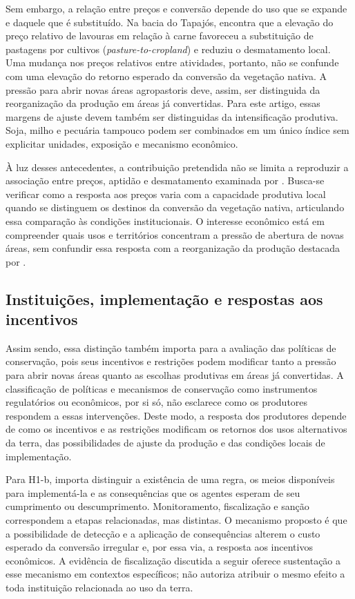 Sem embargo, a relação entre preços e conversão depende do uso que se expande e daquele que é substituído. Na bacia do Tapajós,  encontra que a elevação do preço relativo de lavouras em relação à carne favoreceu a substituição de pastagens por cultivos (\textit{pasture-to-cropland}) e reduziu o desmatamento local. Uma mudança nos preços relativos entre atividades, portanto, não se confunde com uma elevação do retorno esperado da conversão da vegetação nativa. A pressão para abrir novas áreas agropastoris deve, assim, ser distinguida da reorganização da produção em áreas já convertidas. Para este artigo, essas margens de ajuste devem também ser distinguidas da intensificação produtiva. Soja, milho e pecuária tampouco podem ser combinados em um único índice sem explicitar unidades, exposição e mecanismo econômico.

À luz desses antecedentes, a contribuição pretendida não se limita a reproduzir a associação entre preços, aptidão e desmatamento examinada por . Busca-se verificar como a resposta aos preços varia com a capacidade produtiva local quando se distinguem os destinos da conversão da vegetação nativa, articulando essa comparação às condições institucionais. O interesse econômico está em compreender quais usos e territórios concentram a pressão de abertura de novas áreas, sem confundir essa resposta com a reorganização da produção destacada por .

\subsection{Instituições, implementação e respostas aos incentivos}

Assim sendo, essa distinção também importa para a avaliação das políticas de conservação, pois seus incentivos e restrições podem modificar tanto a pressão para abrir novas áreas quanto as escolhas produtivas em áreas já convertidas. A classificação de políticas e mecanismos de conservação como instrumentos regulatórios ou econômicos, por si só, não esclarece como os produtores respondem a essas intervenções. Deste modo, a resposta dos produtores depende de como os incentivos e as restrições modificam os retornos dos usos alternativos da terra, das possibilidades de ajuste da produção e das condições locais de implementação.

Para H1-b, importa distinguir a existência de uma regra, os meios disponíveis para implementá-la e as consequências que os agentes esperam de seu cumprimento ou descumprimento. Monitoramento, fiscalização e sanção correspondem a etapas relacionadas, mas distintas. O mecanismo proposto é que a possibilidade de detecção e a aplicação de consequências alterem o custo esperado da conversão irregular e, por essa via, a resposta aos incentivos econômicos. A evidência de fiscalização discutida a seguir oferece sustentação a esse mecanismo em contextos específicos; não autoriza atribuir o mesmo efeito a toda instituição relacionada ao uso da terra.

